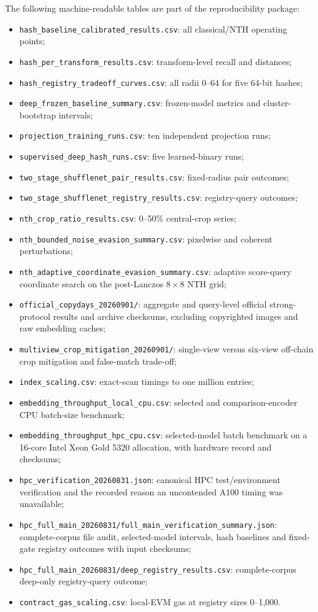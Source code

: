\documentclass[11pt]{article}
\begin{document}
The following machine-readable tables are part of the reproducibility package:
\begin{itemize}
\item \texttt{hash\_baseline\_calibrated\_results.csv}: all classical/NTH operating points;
\item \texttt{hash\_per\_transform\_results.csv}: transform-level recall and distances;
\item \texttt{hash\_registry\_tradeoff\_curves.csv}: all radii 0--64 for five 64-bit hashes;
\item \texttt{deep\_frozen\_baseline\_summary.csv}: frozen-model metrics and cluster-bootstrap intervals;
\item \texttt{projection\_training\_runs.csv}: ten independent projection runs;
\item \texttt{supervised\_deep\_hash\_runs.csv}: five learned-binary runs;
\item \texttt{two\_stage\_shufflenet\_pair\_results.csv}: fixed-radius pair outcomes;
\item \texttt{two\_stage\_shufflenet\_registry\_results.csv}: registry-query outcomes;
\item \texttt{nth\_crop\_ratio\_results.csv}: 0--50\% central-crop series;
\item \texttt{nth\_bounded\_noise\_evasion\_summary.csv}: pixelwise and coherent perturbations;
\item \texttt{nth\_adaptive\_coordinate\_evasion\_summary.csv}: adaptive score-query coordinate search on the post-Lanczos $8\times8$ NTH grid;
\item \texttt{official\_copydays\_20260901/}: aggregate and query-level official strong-protocol results and archive checksums, excluding copyrighted images and raw embedding caches;
\item \texttt{multiview\_crop\_mitigation\_20260901/}: single-view versus six-view off-chain crop mitigation and false-match trade-off;
\item \texttt{index\_scaling.csv}: exact-scan timings to one million entries;
\item \texttt{embedding\_throughput\_local\_cpu.csv}: selected and comparison-encoder CPU batch-size benchmark;
\item \texttt{embedding\_throughput\_hpc\_cpu.csv}: selected-model batch benchmark on a 16-core Intel Xeon Gold 5320 allocation, with hardware record and checksums;
\item \texttt{hpc\_verification\_20260831.json}: canonical HPC test/environment verification and the recorded reason an uncontended A100 timing was unavailable;
\item \texttt{hpc\_full\_main\_20260831/full\_main\_verification\_summary.json}: complete-corpus file audit, selected-model intervals, hash baselines and fixed-gate registry outcomes with input checksums;
\item \texttt{hpc\_full\_main\_20260831/deep\_registry\_results.csv}: complete-corpus deep-only registry-query outcome;
\item \texttt{contract\_gas\_scaling.csv}: local-EVM gas at registry sizes 0--1,000.
\end{itemize}
\end{document}
